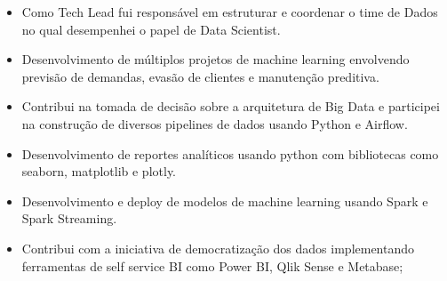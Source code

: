 \documentclass[10pt,a4paper,ragged2e]{altacv}
\begin{document}
\divider

\begin{itemize}
							
	\item Como Tech Lead fui responsável em estruturar e coordenar o time de Dados
	      no qual desempenhei o papel de Data Scientist.
	      	      	      	      	      	      	      
	\item Desenvolvimento de múltiplos projetos de machine learning envolvendo previsão
	      de demandas, evasão de clientes e manutenção preditiva.
	      	      	      	      	      	      	            
	\item Contribui na tomada de decisão sobre a arquitetura de Big Data e participei
	      na construção de diversos pipelines de dados usando Python e Airflow.
	      	      	      	      	      	      	      
	\item Desenvolvimento de reportes analíticos usando python com bibliotecas como seaborn, 
	      matplotlib e plotly.
	      	      	      	      	      	      	      
	\item Desenvolvimento e deploy de modelos de machine learning usando Spark 
	      e Spark Streaming.
	      	      	                  
	\item Contribui com a iniciativa de democratização dos dados implementando ferramentas
	      de self service BI como Power BI, Qlik Sense e Metabase;
	      	      	      	      	      	      	      
	      	      	      	      	      	      	      
\end{itemize}



\divider






\clearpage
\end{document}
